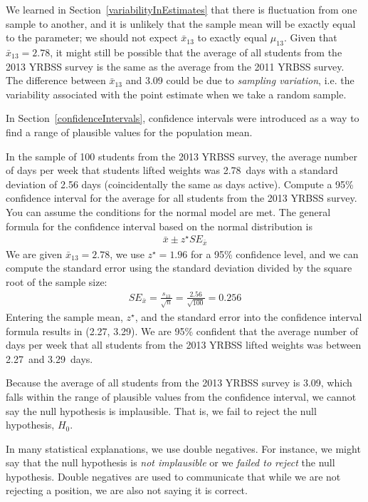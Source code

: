 We learned in Section~\ref{variabilityInEstimates} that there is fluctuation from one sample to another, and it is unlikely that the sample mean will be exactly equal to the parameter; we should not expect $\bar{x}_{13}$ to exactly equal $\mu_{13}$. Given that $\bar{x}_{13} = 2.78$, it might still be possible that the average of all students from the 2013 YRBSS survey is the same as the average from the 2011 YRBSS survey. The difference between $\bar{x}_{13}$ and 3.09 could be due to \emph{sampling variation}, i.e. the variability associated with the point estimate when we take a random sample.

In Section~\ref{confidenceIntervals}, confidence intervals were introduced as a way to find a range of plausible values for the population mean.

\begin{example}{In the sample of 100 students from the 2013 YRBSS survey, the average number of days per week that students lifted weights was 2.78~days with a standard deviation of 2.56 days (coincidentally the same as days active). Compute a 95\% confidence interval for the average for all students from the 2013 YRBSS survey. You can assume the conditions for the normal model are met.}
The general formula for the confidence interval based on the normal distribution is
\begin{align*}
\bar{x} \pm z^{\star} SE_{\bar{x}}
\end{align*}
We are given $\bar{x}_{13} = 2.78$, we use $z^{\star} = 1.96$ for a 95\% confidence level, and we can compute the standard error using the standard deviation divided by the square root of the sample size:
\begin{align*}
SE_{\bar{x}} = \frac{s_{13}}{\sqrt{n}} = \frac{2.56}{\sqrt{100}} = 0.256
\end{align*}
Entering the sample mean, $z^{\star}$, and the standard error into the confidence interval formula results in (2.27, 3.29). We are 95\% confident that the average number of days per week that all students from the 2013 YRBSS lifted weights was between 2.27~and 3.29~days.
\end{example}

Because the average of all students from the 2013 YRBSS survey is 3.09, which falls within the range of plausible values from the confidence interval, we cannot say the null hypothesis is implausible. That is, we fail to reject the null hypothesis, $H_0$.

\begin{tipBox}{
In many statistical explanations, we use double negatives. For instance, we might say that the null hypothesis is \emph{not implausible} or we \emph{failed to reject} the null hypothesis. Double negatives are used to communicate that while we are not rejecting a position, we are also not saying it is correct.}
\end{tipBox}


